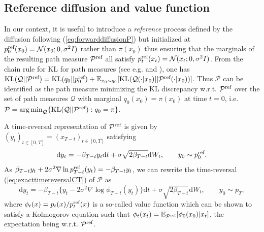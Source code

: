 \documentclass{article} %
\begin{document}
\subsection{Reference diffusion and value function}\label{sec:refdiffusionvaluefunction}
In our context, it is useful to introduce a \emph{reference} process defined by the diffusion following (\ref{eq:forwarddiffusionP}) but initialized at $p^{\textup{ref}}_0(x_0)=\mathcal{N}(x_0;0,\sigma^2 I)$ rather than $\pi(x_0)$ thus ensuring that the marginals of the resulting path measure $\mathcal{P}^{\textup{ref}}$ all satisfy $p^{\textup{ref}}_t(x_t)=\mathcal{N}(x_t;0,\sigma^2 I)$. From the chain rule for KL for path measures (see e.g. \cite[Theorem 2.4]{leonard2014some} and \cite[Proposition 24]{debortoli2021diffusion}), one has $\KL(\mathcal{Q}||\mathcal{P}^{\textup{ref}})=\KL(q_0||p^{\textup{ref}}_0)+\mathbb{E}_{x_0 \sim q_0}[\KL(\mathcal{Q}(\cdot|x_0)||\mathcal{P}^{\textup{ref}}(\cdot|x_0))]$. Thus $\mathcal{P}$ can be identified as the path measure minimizing the KL discrepancy w.r.t. $\mathcal{P}^{\textup{ref}}$ over the set of path measures $\mathcal{Q}$ with marginal $q_0(x_0)=\pi(x_0)$ at time $t=0$, i.e. $ \mathcal{P}= \argmin_\mathcal{Q} \{\KL(\mathcal{Q}||\mathcal{P}^{\textup{ref}}): q_0=\pi\}$.

A time-reversal representation of $\mathcal{P}^{\textup{ref}}$ is given by $(y_t)_{t\in[0,T]}=(x_{T-t})_{t\in[0,T]}$ satisfying 
\begin{equation}\label{eq:timereversalrefprocessCT}
    \mathrm{d}y_t =-\beta_{T-t} y_t \mathrm{d}t+\sigma \sqrt{2\beta_{T-t}} \mathrm{d}W_t,\qquad y_0 \sim p^{\textup{ref}}_0.
\end{equation}
As $\beta_{T-t} y_t +2\sigma^2 \nabla \log p^{\textup{ref}}_{T-t}(y_t)=-\beta_{T-t} y_t$, we can rewrite the time-reversal (\ref{eq:exacttimereversalCT}) of $\mathcal{P}$ as 
\begin{equation}\label{eq:diffusionvaluefunction}
    \mathrm{d}y_t= -\beta_{T-t} \{y_t -2\sigma^2 \nabla \log \phi_{T-t}(y_t)\} \mathrm{d}t+\sigma \sqrt{2\beta_{T-t}} \mathrm{d}W_t,\qquad y_0 \sim p_T,
\end{equation}
where $\phi_t(x)=p_t(x)/p^{\textup{ref}}_t(x)$ is a so-called value function which can be shown to satisfy a Kolmogorov equation such that $\phi_t(x_t)=\mathbb{E}_{\mathcal{P}^{\textup{ref}}}[\phi_0(x_0)|x_t]$, the expectation being w.r.t. $\mathcal{P}^{\textup{ref}}$.
\end{document}
